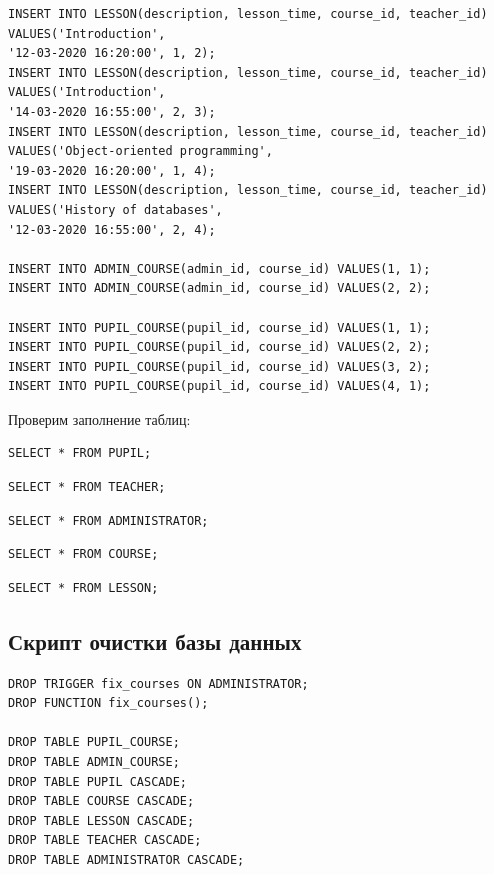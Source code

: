 \documentclass[11pt]{article}
\begin{document}
\begin{verbatim}
INSERT INTO LESSON(description, lesson_time, course_id, teacher_id) VALUES('Introduction',
'12-03-2020 16:20:00', 1, 2);
INSERT INTO LESSON(description, lesson_time, course_id, teacher_id) VALUES('Introduction',
'14-03-2020 16:55:00', 2, 3);
INSERT INTO LESSON(description, lesson_time, course_id, teacher_id) VALUES('Object-oriented programming',
'19-03-2020 16:20:00', 1, 4);
INSERT INTO LESSON(description, lesson_time, course_id, teacher_id) VALUES('History of databases',
'12-03-2020 16:55:00', 2, 4);

INSERT INTO ADMIN_COURSE(admin_id, course_id) VALUES(1, 1);
INSERT INTO ADMIN_COURSE(admin_id, course_id) VALUES(2, 2);

INSERT INTO PUPIL_COURSE(pupil_id, course_id) VALUES(1, 1);
INSERT INTO PUPIL_COURSE(pupil_id, course_id) VALUES(2, 2);
INSERT INTO PUPIL_COURSE(pupil_id, course_id) VALUES(3, 2);
INSERT INTO PUPIL_COURSE(pupil_id, course_id) VALUES(4, 1);
\end{verbatim}

Проверим заполнение таблиц:
\begin{verbatim}
SELECT * FROM PUPIL;
\end{verbatim}
\begin{verbatim}
SELECT * FROM TEACHER;
\end{verbatim}
\begin{verbatim}
SELECT * FROM ADMINISTRATOR;
\end{verbatim}
\begin{verbatim}
SELECT * FROM COURSE;
\end{verbatim}
\begin{verbatim}
SELECT * FROM LESSON;
\end{verbatim}
\subsection{Скрипт очистки базы данных}
\label{sec:orgca5ea8c}
\begin{verbatim}
DROP TRIGGER fix_courses ON ADMINISTRATOR;
DROP FUNCTION fix_courses();

DROP TABLE PUPIL_COURSE;
DROP TABLE ADMIN_COURSE;
DROP TABLE PUPIL CASCADE;
DROP TABLE COURSE CASCADE;
DROP TABLE LESSON CASCADE;
DROP TABLE TEACHER CASCADE;
DROP TABLE ADMINISTRATOR CASCADE;
\end{verbatim}
\end{document}
